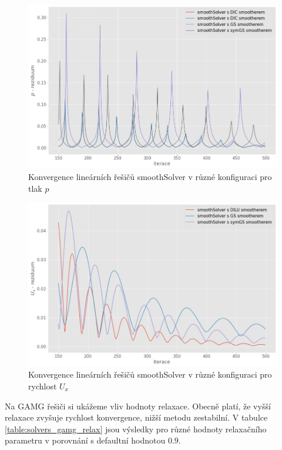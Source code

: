 \documentclass[a4paper,12pt]{report}
\theoremstyle{remark}
\begin{document}
\begin{figure}[H]
	\centering
	\includegraphics[width=1\linewidth]{p-residuum-smooth.png}
	\caption{Konvergence lineárních řešičů smoothSolver v různé konfiguraci pro tlak $p$}
	\label{fig:p-residuum-smooth}
\end{figure}

\begin{figure}[H]
	\centering
	\includegraphics[width=1\linewidth]{ux-residuum-smooth.png}
	\caption{Konvergence lineárních řešičů smoothSolver v různé konfiguraci pro rychlost $U_x$}
	\label{fig:ux-residuum-smooth}
\end{figure}
	


Na GAMG řešiči si ukážeme vliv hodnoty relaxace. Obecně platí, že vyšší relaxace zvyšuje rychlost konvergence, nižší metodu zestabilní. V tabulce \ref{table:solvers_gamg_relax} jsou výsledky pro různé hodnoty relaxačního parametru v porovnání s defaultní hodnotou $0.9$. 
\end{document}
